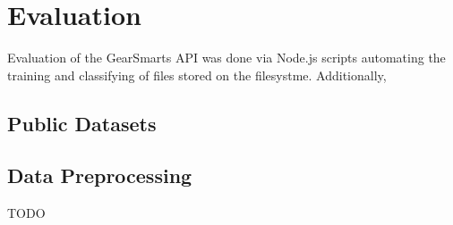 \section{Evaluation}
\label{section:evaluation}
Evaluation of the GearSmarts API was done via Node.js scripts automating the training and classifying of files
stored on the filesystme. Additionally,

\subsection{Public Datasets}
\label{subsection:publicdatasets}

\subsection{Data Preprocessing}
\label{subsection:preprocessing}

TODO